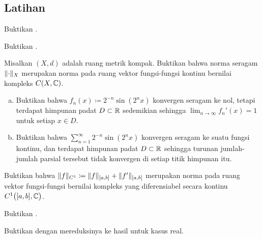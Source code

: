 \subsection{Latihan}

\begin{exercise}
Buktikan .
\end{exercise}

\begin{exercise}
Buktikan .
\end{exercise}

\begin{exercise} \label{exercise:CXCnormedspace}
Misalkan $(X,d)$ adalah ruang metrik kompak.
Buktikan bahwa norma seragam $\lVert {\cdot} \rVert_X$ merupakan norma pada ruang vektor
fungsi-fungsi kontinu bernilai kompleks $C(X,{\mathbb{C}})$.
\end{exercise}

\begin{exercise}
\pagebreak[2]
\leavevmode
\begin{enumerate}[a)]
\item
Buktikan bahwa
$f_n(x) \coloneqq 2^{-n} \sin(2^n x)$
konvergen seragam ke nol, tetapi terdapat himpunan padat $D \subset {\mathbb{R}}$
sedemikian sehingga $\lim_{n\to\infty} f_n'(x) = 1$ untuk setiap $x \in D$.
\item
Buktikan bahwa
$\sum_{n=1}^\infty 2^{-n} \sin(2^n x)$
konvergen seragam ke suatu fungsi kontinu,
dan terdapat himpunan padat $D \subset {\mathbb{R}}$
sehingga turunan jumlah-jumlah parsial tersebut tidak konvergen di setiap titik himpunan itu.
\end{enumerate}
\end{exercise}

\begin{exercise}
Buktikan bahwa $\lVert {f} \rVert_{C^1} \coloneqq \lVert {f} \rVert_{[a,b]}+\lVert {f'} \rVert_{[a,b]}$
merupakan norma pada ruang vektor fungsi-fungsi bernilai kompleks yang
diferensiabel secara kontinu $C^1\bigl([a,b],{\mathbb{C}}\bigr)$.
\end{exercise}

\begin{exercise}
Buktikan .
\end{exercise}

\begin{exercise}
Buktikan  dengan mereduksinya ke
hasil untuk kasus real.
\end{exercise}

